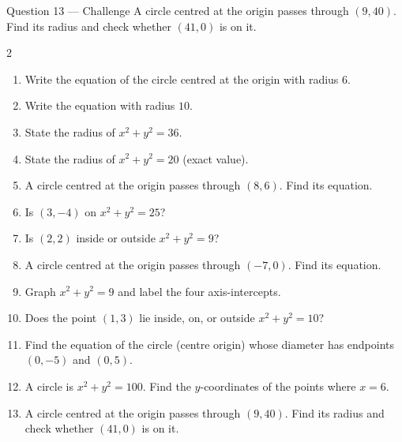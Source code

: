 \documentclass[11pt]{article}
\begin{document}
\begin{qbox}{Question 13 --- Challenge}
A circle centred at the origin passes through $(9,40)$. Find its radius and check whether $(41,0)$ is on it.\workspace{3.0cm}
\end{qbox}

\clearpage
{}

\begin{recapbox}
\begin{multicols}{2}
\small
\begin{enumerate}[leftmargin=*,itemsep=3pt]
  \item Write the equation of the circle centred at the origin with radius $6$.
  \item Write the equation with radius $10$.
  \item State the radius of $x^2+y^2=36$.
  \item State the radius of $x^2+y^2=20$ (exact value).
  \item A circle centred at the origin passes through $(8,6)$. Find its equation.
  \item Is $(3,-4)$ on $x^2+y^2=25$?
  \item Is $(2,2)$ inside or outside $x^2+y^2=9$?
  \item A circle centred at the origin passes through $(-7,0)$. Find its equation.
  \item Graph $x^2+y^2=9$ and label the four axis-intercepts.
  \item Does the point $(1,3)$ lie inside, on, or outside $x^2+y^2=10$?
  \item Find the equation of the circle (centre origin) whose diameter has endpoints $(0,-5)$ and $(0,5)$.
  \item A circle is $x^2+y^2=100$. Find the $y$-coordinates of the points where $x=6$.
  \item A circle centred at the origin passes through $(9,40)$. Find its radius and check whether $(41,0)$ is on it.
\end{enumerate}
\end{multicols}
\end{recapbox}
\end{document}
